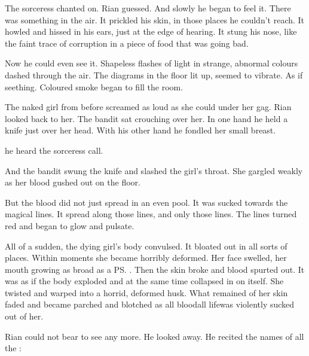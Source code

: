 The sorceress chanted on. 
 Rian guessed. 
And slowly he began to feel it. 
There was something in the air. 
It prickled his skin, in those places he couldn't reach. 
It howled and hissed in his ears, just at the edge of hearing. 
It stung his nose, like the faint trace of corruption in a piece of food that was going bad. 

Now he could even see it. 
Shapeless flashes of light in strange, abnormal colours dashed through the air. 
The diagrams in the floor lit up, seemed to vibrate. 
As if seething. 
Coloured smoke began to fill the room. 


The naked girl from before screamed as loud as she could under her gag. 
Rian looked back to her.
The bandit sat crouching over her. 
In one hand he held a knife just over her head. 
With his other hand he fondled her small breast. 

 he heard the sorceress call. 

And the bandit swung the knife and slashed the girl's throat. 
She gargled weakly as her blood gushed out on the floor.

But the blood did not just spread in an even pool. 
It was sucked towards the magical lines. 
It spread along those lines, and only those lines. 
The lines turned red and began to glow and pulsate. 

All of a sudden, the dying girl's body convulsed. 
It bloated out in all sorts of places. 
Within moments she became horribly deformed. 
Her face swelled, her mouth growing as broad as a \ps{\meccaran}. 
Then the skin broke and blood spurted out. 
It was as if the body exploded and at the same time collapsed in on itself. 
She twisted and warped into a horrid, deformed husk. 
What remained of her skin faded and became parched and blotched as all blood\dash all life\dash was violently sucked out of her. 

Rian could not bear to see any more. 
He looked away. 
He recited the names of all the \sephiroth:

